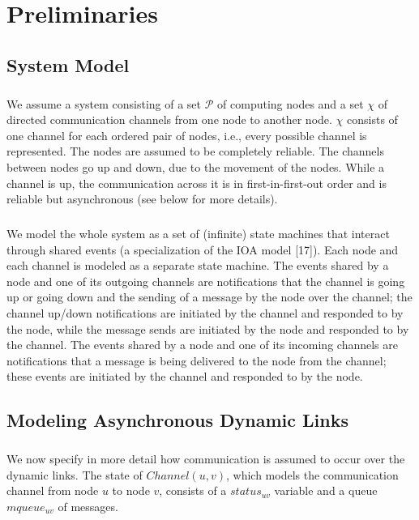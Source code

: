 \chapter{Preliminaries}
\section{System Model}
\paragraph{}We assume a system consisting of a set $\mathcal{P}$ of computing nodes and a set $\chi$ of directed communication channels from one node to another node. $\chi$ consists of one channel for each ordered pair of nodes, i.e., every possible channel is represented. The nodes are assumed to be completely reliable. The channels between nodes go up and down, due to the movement of the nodes. While a channel is up, the communication across it is in first-in-first-out order and is reliable but asynchronous (see below for more details).
\paragraph{}We model the whole system as a set of (infinite) state machines that interact through shared events (a specialization of the IOA model [17]). Each node and each channel is modeled as a separate state machine. The events shared by a node and one of its outgoing channels are notifications that the channel is going up or going down and the sending of a message by the node over the channel; the channel up/down notifications are initiated by the channel and responded to by the node, while the message sends are initiated by the node and responded to by the channel. The events shared by a node and one of its incoming channels are notifications that a message is being delivered to the node from the channel; these events are initiated by the channel and responded to by the node.
\newpage
\section{Modeling Asynchronous Dynamic Links}
\paragraph{}We now specify in more detail how communication is assumed to occur over the dynamic links. The state of $Channel(u, v)$, which models the communication channel from node $u$ to node $v$, consists of a $status_{uv}$ variable and a queue $mqueue_{uv}$ of messages.
